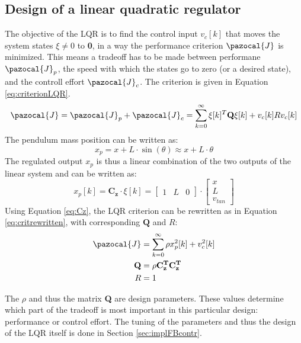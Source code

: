\documentclass[a4paper,kul]{kulakarticle} %
\newcommand{\J}{\pazocal{J}}
\begin{document}
\subsection{Design of a linear quadratic regulator}
\label{sec:designLQR}
The objective of the LQR is to find the control input $v_c[k]$ that moves the system states $\xi \neq 0$ to \textbf{0}, in a way the performance criterion $\J$ is minimized. This means a tradeoff has to be made between performane $\J_p$, the speed with which the states go to zero (or a desired state), and the controll effort $\J_c$. The criterion is given in Equation \ref{eq:criterionLQR}. 
\begin{equation}
\J = \J_p + \J_c =  \sum_{k=0}^{\infty}\mathbf{\xi}[k]^T\mathbf{Q}\mathbf{\xi}[k] + v_c[k]Rv_c[k]
\label{eq:criterionLQR}
\end{equation}
The pendulum mass position can be written as:
\begin{equation}
x_p = x + L\cdot \sin(\theta) \approx x + L\cdot \theta
\label{eq:xp}
\end{equation}
The regulated output $x_p$ is thus a linear combination of the two outputs of the linear system and can be written as:
\begin{equation}
	x_p[k] = \mathbf{C_z}\cdot\xi[k] = \begin{bmatrix}
	1&L&0
	\end{bmatrix}\cdot\begin{bmatrix}
	x\\L\\v_{tan}
	\end{bmatrix}
	\label{eq:Cz}
\end{equation}
Using Equation \ref{eq:Cz}, the LQR criterion can be rewritten as in Equation \ref{eq:critrewritten}, with corresponding $\mathbf{Q}$ and $R$:
\begin{equation}
\begin{split}
	\J &=  \sum_{k=0}^{\infty}\rho x_p^2[k] + v_c^2[k]\\
	\mathbf{Q} &= \rho \mathbf{C_z^T}\mathbf{C_z^T}\\
	R &= 1
\end{split}
\label{eq:critrewritten}
\end{equation}


The $\rho$ and thus the matrix \textbf{Q} are design parameters. These values determine which part of the tradeoff is most important in this particular design: performance or control effort. The tuning of the parameters and thus the design of the LQR itself is done in Section \ref{sec:implFBcontr}. 
\end{document}
